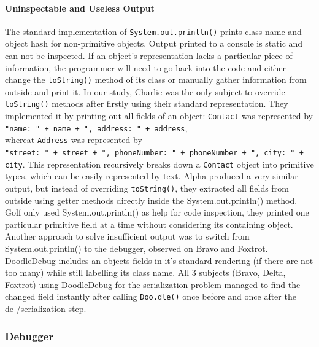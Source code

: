 \documentclass[english]{acm_proc_article-sp}
\begin{document}
\paragraph{Uninspectable and Useless Output}
The standard implementation of \verb-System.out.println()- prints class name and object hash for non-primitive objects. 
Output printed to a console is static and can not be inspected. 
If an object's representation lacks a particular piece of information, the programmer will need to go back into the code and either change the \verb.toString(). 
method of its class or manually gather information from outside and print it. 
In our study, Charlie was the only subject to override \verb.toString(). 
methods after firstly using their standard representation. 
They implemented it by printing out all fields of an object: \verb.Contact. 
was represented by\\
\verb-"name: " + name + ", address: " + address-,\\
whereat \verb.Address. 
was represented by\\
\verb-"street: " + street + ", phoneNumber: " + phoneNumber + ", city: " + city-.
This representation recursively breaks down a \verb.Contact. 
object into primitive types, which can be easily represented by text. 
Alpha produced a very similar output, but instead of overriding \verb.toString()., they extracted all fields from outside using getter methods directly inside the System.out.println() method. 
Golf only used System.out.println() as help for code inspection, they printed one particular primitive field at a time without considering its containing object.\\
Another approach to solve insufficient output was to switch from System.out.println() to the debugger, observed on Bravo and Foxtrot.\\
DoodleDebug includes an objects fields in it's standard rendering (if there are not too many) while still labelling its class name. 
All 3 subjects (Bravo, Delta, Foxtrot) using DoodleDebug for the serialization problem managed to find the changed field instantly after calling \verb-Doo.dle()- once before and once after the de-/serialization step.

\subsubsection{Debugger}
\end{document}
